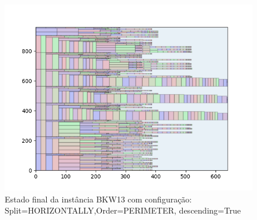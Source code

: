 \begin{figure}[H]
    \centering
    \caption[]{Estado final da instância BKW13 com configuração: Split=HORIZONTALLY,Order=PERIMETER, descending=True}
    \label{fig:bkw13-horizontally-perimeter-true}
    \includegraphics[scale=0.5]{output/figures/bkw/bkw13/horizontally/perimeter/true/0000}
\end{figure}